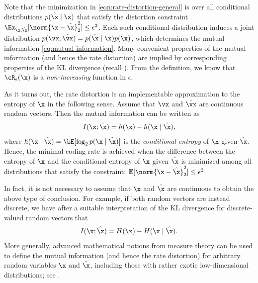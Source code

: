 \documentclass[../../book-main.tex]{subfiles}
\begin{document}
Note that the minimization
in \eqref{eqn:rate-distortion-general} is over all conditional distributions $p(\hat \x \mid \x)$
that satisfy the distortion constraint $\Ex_{\x, \hat \x}[\norm{\x- \hat \x}_2^{2}] \le \epsilon^{2}$. 
Each such conditional distribution induces a joint distribution $p(\vx,
\hat{\vx}) = p(\hat\x \mid \x) p(\x)$, which determines the mutual
information \eqref{eq:mutual-information}.
Many convenient properties of the mutual information (and hence the rate
distortion) are implied by corresponding properties of the KL divergence (recall
).
From the definition, we know that $\cR_{\epsilon}(\x)$ is a {\em non-increasing}
function in $\epsilon$.

\begin{remark}
	As it turns out, the rate distortion is an implementable
	approximation to the entropy of $\x$ in the following sense.
	Assume that $\vx$ and $\hat{\vx}$ are continuous random vectors.
	Then the mutual information can be written as
	\begin{equation}\label{eq:information-entropy}
		I(\x; \hat\x) = h(\x) - h(\x \mid \hat \x),
	\end{equation}
	where $h(\x \mid \hat \x) = \bE[\log_2 p(\x \mid \hat\x)]$ is the
	\textit{conditional entropy} of $\x$ given $\hat \x$.
	Hence, the minimal coding rate is achieved when the difference between the
	entropy of $\x$ and the conditional entropy of $\x$ given $\hat \x$
	is minimized among all distributions that satisfy
	the constraint: $\mathbb{E} [\norm{\x- \hat \x}_2^2] \le \epsilon^2$. 

	In fact, it is not necessary to assume that $\x$ and $\hat \x$ are continuous
	to obtain the above type of conclusion. For example, if both random vectors
	are instead discrete, we have after a suitable interpretation of the KL
	divergence for discrete-valued random vectors that
	\begin{equation}
		I(\x; \hat\x) = H(\x) - H(\x \mid \hat \x).
	\end{equation}
	More generally, advanced mathematical notions from measure theory can be
	used to define the mutual information (and hence the rate distortion) for
	arbitrary random variables $\x$ and $\hat \x$, including those with rather
	exotic low-dimensional distributions; see \textcite[\S 8.5]{Cover-Thomas}.
\end{remark}
\end{document}
